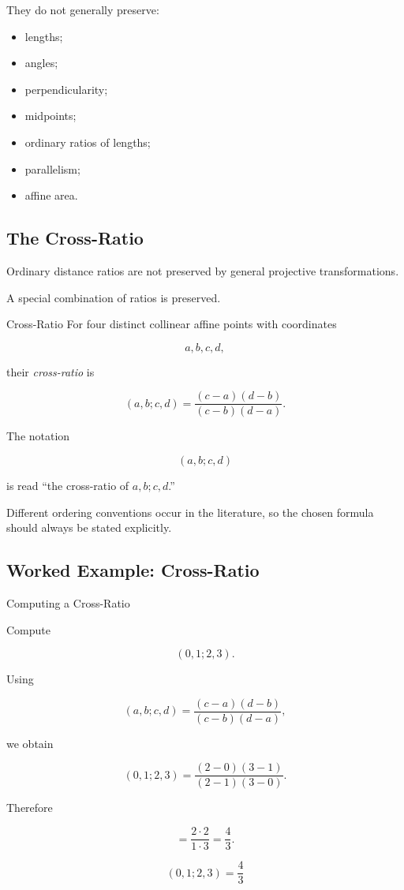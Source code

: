 They do not generally preserve:

\begin{itemize}
    \item lengths;
    \item angles;
    \item perpendicularity;
    \item midpoints;
    \item ordinary ratios of lengths;
    \item parallelism;
    \item affine area.
\end{itemize}

\subsection{The Cross-Ratio}
\label{subsec:cross-ratio}

Ordinary distance ratios are not preserved by general projective
transformations.

A special combination of ratios is preserved.

\begin{definitionbox}{Cross-Ratio}
For four distinct collinear affine points with coordinates

\[
a,b,c,d,
\]

their \emph{cross-ratio} is

\[
\boxed{
(a,b;c,d)
=
\frac{(c-a)(d-b)}
     {(c-b)(d-a)}.
}
\]
\end{definitionbox}

The notation

\[
(a,b;c,d)
\]

is read ``the cross-ratio of \(a,b;c,d\).''

Different ordering conventions occur in the literature, so the chosen
formula should always be stated explicitly.

\subsection{Worked Example: Cross-Ratio}
\label{subsec:worked-cross-ratio}

\begin{workedexamplebox}{Computing a Cross-Ratio}

Compute

\[
(0,1;2,3).
\]

Using

\[
(a,b;c,d)
=
\frac{(c-a)(d-b)}
     {(c-b)(d-a)},
\]

we obtain

\[
(0,1;2,3)
=
\frac{(2-0)(3-1)}
     {(2-1)(3-0)}.
\]

Therefore

\[
=
\frac{2\cdot2}{1\cdot3}
=
\frac43.
\]

\begin{answerbox}
\[
\boxed{(0,1;2,3)=\frac43}
\]
\end{answerbox}
\end{workedexamplebox}

